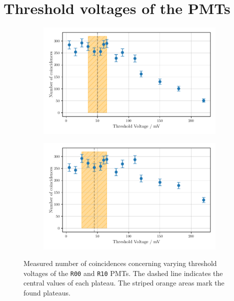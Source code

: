 \chapter{Threshold voltages of the PMTs}
\label{sec:appendix}
\begin{figure}
    \centering
    \begin{subfigure}[b]{0.48\textwidth}
    \includegraphics[width=\textwidth]{plots/threshR00.pdf}
\end{subfigure}\hfill
\begin{subfigure}[b]{0.48\textwidth}
    \includegraphics[width=\textwidth]{plots/threshR10_2.pdf}
\end{subfigure}
\caption{Measured number of coincidences concerning varying threshold voltages
of the \texttt{R00} and \texttt{R10} PMTs.
The dashed line indicates the central values of each plateau. The striped orange areas mark the found plateaus.}
\label{fig:appthresh1}
\end{figure}
